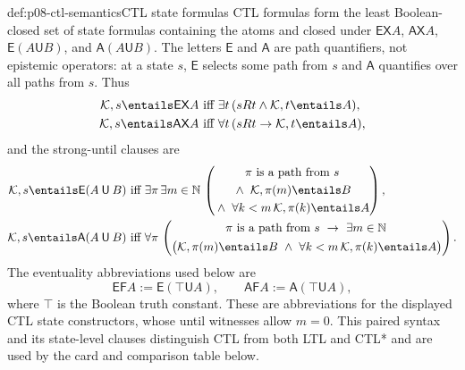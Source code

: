 \begin{hbdefinition}{def:p08-ctl-semantics}{CTL state formulas}
CTL formulas form the least Boolean-closed set of state formulas containing
the atoms and closed under
\(\mathsf{EX}A\), \(\mathsf{AX}A\),
\(\mathsf E(A\mathbin{\mathsf U}B)\), and
\(\mathsf A(A\mathbin{\mathsf U}B)\).  The letters \(\mathsf E\) and
\(\mathsf A\) are path quantifiers, not epistemic operators: at a state \(s\),
\(\mathsf E\) selects some path from \(s\) and \(\mathsf A\) quantifies over
all paths from \(s\).  Thus
\[
\begin{aligned}
 \mathcal K,s\entails\mathsf{EX}A
 &\text{ iff }
   \exists t\,(sRt\land\mathcal K,t\entails A),\\
 \mathcal K,s\entails\mathsf{AX}A
 &\text{ iff }
   \forall t\,(sRt\to\mathcal K,t\entails A),
\end{aligned}
\]
 and the strong-until clauses are
 \[
 \begin{aligned}
  \mathcal K,s\entails\mathsf E(A\mathbin{\mathsf U}B)
  &\text{ iff }
    \exists\pi\,\exists m\in\mathbb N\,
    \left(
      \begin{gathered}
        \pi\text{ is a path from }s\\
        {}\land\ \mathcal K,\pi(m)\entails B\\
        {}\land\ \forall k<m\,\mathcal K,\pi(k)\entails A
      \end{gathered}
    \right),\\
  \mathcal K,s\entails\mathsf A(A\mathbin{\mathsf U}B)
  &\text{ iff }
    \forall\pi\,
    \left(
      \begin{gathered}
        \pi\text{ is a path from }s\ \to\ \exists m\in\mathbb N\,\\
        \bigl(\mathcal K,\pi(m)\entails B\ \land\
          \forall k<m\,\mathcal K,\pi(k)\entails A\bigr)
      \end{gathered}
    \right).
 \end{aligned}
 \]
 The eventuality abbreviations used below are
 \[
  \mathsf{EF}A:=\mathsf E(\top\mathbin{\mathsf U}A),
  \qquad
  \mathsf{AF}A:=\mathsf A(\top\mathbin{\mathsf U}A),
 \]
 where \(\top\) is the Boolean truth constant.  These are abbreviations
 for the displayed CTL state constructors, whose until witnesses allow
 \(m=0\).
 This paired syntax and its state-level clauses distinguish CTL from both LTL
 and CTL* and are used by the card and comparison table below.
\end{hbdefinition}

